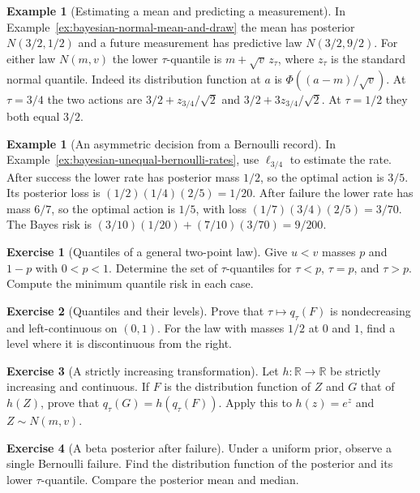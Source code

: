 \documentclass[11pt,oneside]{book}
\theoremstyle{definition}
\newtheorem{example}[theorem]{Example}
\newtheorem{exercise}{Exercise}[section]
\theoremstyle{remark}
\newcommand{\R}{\mathbb R}
\begin{document}
\begin{example}[Estimating a mean and predicting a measurement]
\label{ex:bayesian-quantile-normal-prediction}
In Example~\ref{ex:bayesian-normal-mean-and-draw} the mean has
posterior $N(3/2,1/2)$ and a future measurement has predictive
law $N(3/2,9/2)$. For either law $N(m,v)$ the lower
$\tau$-quantile is $m+\sqrt v\,z_\tau$, where $z_\tau$ is the
standard normal quantile. Indeed its distribution function at
$a$ is $\Phi((a-m)/\sqrt v)$.
At $\tau=3/4$ the two actions are
$3/2+z_{3/4}/\sqrt2$ and $3/2+3z_{3/4}/\sqrt2$.
At $\tau=1/2$ they both equal $3/2$.
\end{example}

\begin{example}[An asymmetric decision from a Bernoulli record]
\label{ex:bayesian-quantile-two-rate-decision}
In Example~\ref{ex:bayesian-unequal-bernoulli-rates}, use
$\ell_{3/4}$ to estimate the rate. After success the lower rate
has posterior mass $1/2$, so the optimal action is $3/5$.
Its posterior loss is $(1/2)(1/4)(2/5)=1/20$.
After failure the lower rate has mass $6/7$, so the optimal
action is $1/5$, with loss $(1/7)(3/4)(2/5)=3/70$.
The Bayes risk is $(3/10)(1/20)+(7/10)(3/70)=9/200$.
\end{example}

\begin{exercise}[Quantiles of a general two-point law]
\label{exer:bayesian-quantile-two-point}
Give $u<v$ masses $p$ and $1-p$ with $0<p<1$. Determine the
set of $\tau$-quantiles for $\tau<p$, $\tau=p$, and $\tau>p$.
Compute the minimum quantile risk in each case.
\end{exercise}

\begin{exercise}[Quantiles and their levels]
\label{exer:bayesian-quantile-monotonicity}
Prove that $\tau\mapsto q_\tau(F)$ is nondecreasing and
left-continuous on $(0,1)$. For the law with masses $1/2$ at
$0$ and $1$, find a level where it is discontinuous from the right.
\end{exercise}

\begin{exercise}[A strictly increasing transformation]
\label{exer:bayesian-quantile-transformation}
Let $h:\R\to\R$ be strictly increasing and continuous. If $F$ is
the distribution function of $Z$ and $G$ that of $h(Z)$,
prove that $q_\tau(G)=h(q_\tau(F))$. Apply this to $h(z)=e^z$
and $Z\sim N(m,v)$.
\end{exercise}

\begin{exercise}[A beta posterior after failure]
\label{exer:bayesian-quantile-beta-failure}
Under a uniform prior, observe a single Bernoulli failure.
Find the distribution function of the posterior and its lower
$\tau$-quantile. Compare the posterior mean and median.
\end{exercise}
\end{document}
